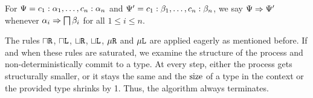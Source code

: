 \begin{definition}
  For $\Psi = c_1 : \alpha_1, \ldots, c_n : \alpha_n$ and $\Psi' = c_1 : \beta_1, \ldots, c_n : \beta_n$, we say $\Psi \mathrel\Rightarrow \Psi'$ whenever $\alpha_i \mathrel\Rightarrow \operatorname{\bigsqcap} \beta_i$ for all $1 \le i \le n$.
\end{definition}


The rules $\mathbin{\sqcap}\texttt{R}$, $\mathbin{\sqcap}\texttt{L}$, $\mathbin{\sqcup}\texttt{R}$, $\mathbin{\sqcup}\texttt{L}$, $\mu\texttt{R}$ and $\mu\texttt{L}$ are applied eagerly as mentioned before. If and when these rules are saturated, we examine the structure of the process and non-deterministically commit to a type. At every step, either the process gets structurally smaller, or it stays the same and the $\operatorname{size}$ of a type in the context or the provided type shrinks by 1. Thus, the algorithm always terminates.

